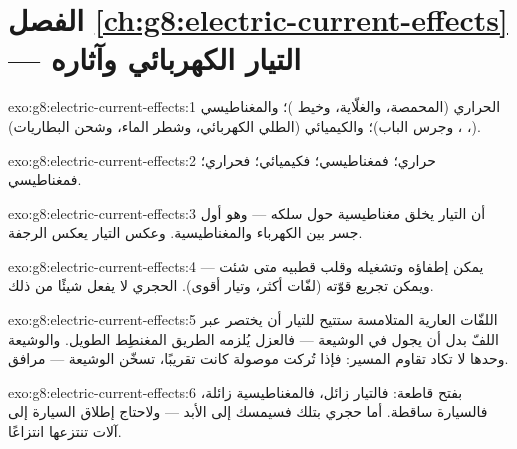 \section*{الفصل \ref{ch:g8:electric-current-effects} --- التيار الكهربائي وآثاره}

\begin{solution}{exo:g8:electric-current-effects:1}
الحراري (المحمصة، والغلّاية، وخيط )؛ والمغناطيسي
(، ، وجرس الباب)؛ والكيميائي (الطلي
الكهربائي، وشطر الماء، وشحن البطاريات).
\end{solution}

\begin{solution}{exo:g8:electric-current-effects:2}
حراري؛ فمغناطيسي؛ فكيميائي؛ فحراري؛ فمغناطيسي.
\end{solution}

\begin{solution}{exo:g8:electric-current-effects:3}
أن التيار يخلق مغناطيسية حول سلكه --- وهو أول جسر بين الكهرباء
والمغناطيسية. وعكس التيار يعكس الرجفة.
\end{solution}

\begin{solution}{exo:g8:electric-current-effects:4}
يمكن إطفاؤه وتشغيله وقلب قطبيه متى شئت --- ويمكن تجريع قوّته
(لفّات أكثر، وتيار أقوى).  الحجري لا يفعل شيئًا من
ذلك.
\end{solution}

\begin{solution}{exo:g8:electric-current-effects:5}
اللفّات العارية المتلامسة ستتيح للتيار أن يختصر عبر اللفّ بدل
أن يجول في الوشيعة --- فالعزل يُلزمه الطريق المغنطِط الطويل.
والوشيعة وحدها لا تكاد تقاوم المسير: فإذا تُركت موصولة كانت
 تقريبًا، تسخّن الوشيعة  --- 
مرافق.
\end{solution}

\begin{solution}{exo:g8:electric-current-effects:6}
بفتح قاطعة: فالتيار زائل، فالمغناطيسية زائلة، فالسيارة ساقطة.
أما  حجري بتلك  فسيمسك إلى الأبد --- ولاحتاج إطلاق
السيارة إلى آلات تنتزعها انتزاعًا.
\end{solution}

